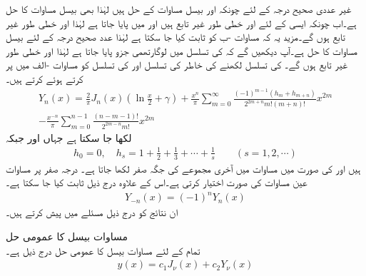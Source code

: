 غیر عددی صحیح درجہ  کے لئے چونکہ  اور  بیسل مساوات کے حل ہیں لہٰذا    بھی بیسل مساوات کا حل ہے۔اب چونکہ ایسی  کے لئے  اور  خطی طور غیر تابع ہیں اور  میں  پایا جاتا ہے لہٰذا  اور  خطی طور غیر تابع ہوں گے۔مزید یہ کہ مساوات -ب کو ثابت  کیا جا سکتا ہے لہٰذا عدد صحیح درجہ کے لئے  بیسل مساوات کا حل ہے۔آپ دیکھیں گے کہ  کی تسلسل میں لوگارتھمی جزو پایا جاتا ہے لہٰذا  اور  خطی طور غیر تابع ہوں گے۔ کی تسلسل لکھنے کی خاطر  کی تسلسل  اور  کی تسلسل  کو مساوات -الف میں پر کرتے ہوئے  کرتے ہیں۔
\begin{multline}\label{مساوات_بیسل_نیومن_عدد_صحیح_الف}
Y_n(x)=\frac{2}{\pi}J_n(x)\left(\ln \frac{x}{2}+\gamma\right)+\frac{x^n}{\pi}\sum_{m=0}^{\infty} \frac{(-1)^{m-1}(h_m+h_{m+n})}{2^{2m+n}m!(m+n)!}x^{2m}\\
-\frac{x^{-n}}{\pi}\sum_{m=0}^{n-1}\frac{(n-m-1)!}{2^{2m-n}m!}x^{2m}
\end{multline}
لکھا جا سکتا ہے جہاں  اور   جبکہ
\begin{align*}
h_0=0,\quad h_s=1+\frac{1}{2}+\frac{1}{3}+\cdots+\frac{1}{s} \quad \quad (s=1,2,\cdots)
\end{align*}
ہیں اور  کی صورت میں مساوات  میں آخری مجموعے کی جگہ صفر لکھا جاتا ہے۔ درجہ صفر  پر  مساوات  عین مساوات  کی صورت اختیار کرتی ہے۔اس کے علاوہ درج ذیل ثابت کیا جا سکتا ہے۔
\begin{align}
Y_{-n}(x)=(-1)^nY_n(x)
\end{align}
ان نتائج کو درج ذیل مسئلے میں پیش کرتے ہیں۔

 مساوات بیسل کا عمومی حل\\
تمام  کے لئے مساوات بیسل کا عمومی حل درج ذیل ہے۔
\begin{align}
y(x)=c_1J_{\nu}(x)+c_2Y_{\nu}(x)
\end{align}

